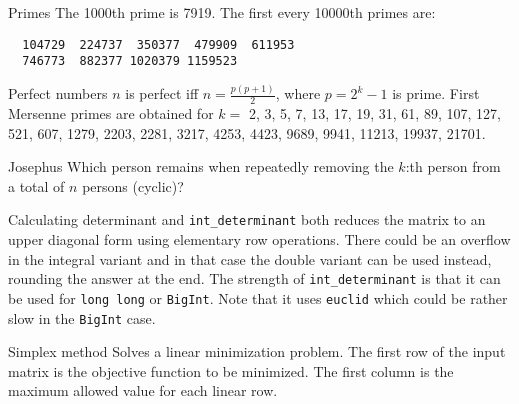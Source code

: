 \clearpage
{}
\categorycontents{}




\begin{algorithm}{Primes}
\desc
The 1000th prime is 7919. The first every 10000th primes are:
{\small
\begin{verbatim}
  104729  224737  350377  479909  611953
  746773  882377 1020379 1159523
\end{verbatim}
}\end{algorithm}




\begin{algorithm}{Perfect numbers}
\desc
$n$ is perfect iff $n = \frac{p(p+1)}{2}$, where $p = 2^k-1$ is prime.
First Mersenne primes are obtained for $k =$ 2, 3, 5, 7, 13, 17, 19,
31, 61, 89, 107, 127, 521, 607, 1279, 2203, 2281, 3217, 4253, 4423,
9689, 9941, 11213, 19937, 21701.
\end{algorithm}

\begin{algorithm}{Josephus}
\desc
Which person remains when repeatedly removing the $k$:th person from a
total of $n$ persons (cyclic)?
\end{algorithm}



\begin{algorithm}{Calculating determinant}
 and {\tt int\_determinant} both reduces the matrix
to an upper diagonal form using elementary row operations. There could be an
overflow in the integral variant and in that case the double variant
can be used instead, rounding the answer at the end. The strength of
{\tt int\_determinant} is that it can be used for {\tt long long} or
{\tt BigInt}. Note that it uses {\tt euclid} which could be rather
slow in the {\tt BigInt} case.
\end{algorithm}

\begin{algorithm}{Simplex method}
\desc
Solves a linear minimization problem. The first row of the
input matrix is the objective function to be minimized. The
first column is the maximum allowed value for each linear row.
\end{algorithm}




